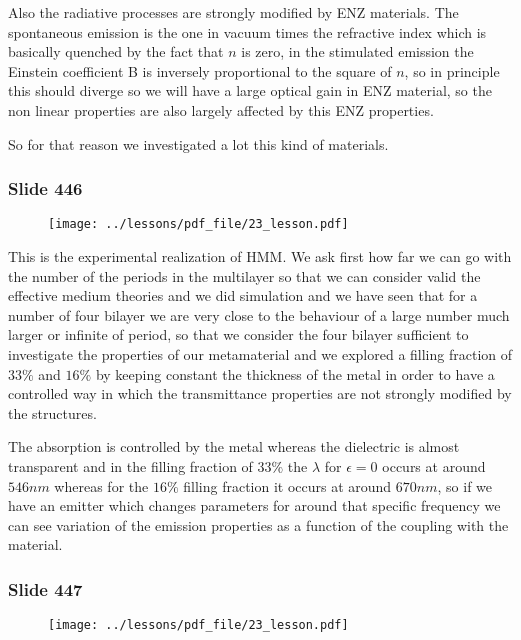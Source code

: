 \documentclass[../main/main.tex]{subfiles}
\begin{document}
Also the radiative processes are strongly modified by ENZ materials. The spontaneous emission is the one in vacuum times the refractive index which is basically quenched by the fact that $n$ is zero, in the stimulated emission the Einstein coefficient B is inversely proportional to the square of $n$, so in principle this should diverge so we will have a large optical gain in ENZ material, so the non linear properties are also largely affected by this ENZ properties.

So for that reason we investigated a lot this kind of materials.

\newpage

\subsubsection{Slide 446}

\begin{figure}[h!]
\centering
\texttt{[image: ../lessons/pdf\_file/23\_lesson.pdf]}
\end{figure}

This is the experimental realization of HMM. We ask first how far we can go with the number of the periods in the multilayer so that we can consider valid the effective medium theories and we did simulation and we have seen that for a number of four bilayer we are very close to the behaviour of a large number much larger or infinite of period, so that we consider the four bilayer sufficient to investigate the properties of our metamaterial and we explored a filling fraction of $33\%$ and $16\%$ by keeping constant the thickness of the metal in order to have a controlled way in which the transmittance properties are not strongly modified by the structures.

The absorption is controlled by the metal whereas the dielectric is almost transparent and in the filling fraction of $33\%$ the $\lambda$ for $\epsilon = 0$ occurs at around $546 nm$ whereas for the $16\%$ filling fraction it occurs at around $670 nm$, so if we have an emitter which changes parameters for around that specific frequency we can see variation of the emission properties as a function of the coupling with the material.

\newpage

\subsubsection{Slide 447}

\begin{figure}[h!]
\centering
\texttt{[image: ../lessons/pdf\_file/23\_lesson.pdf]}
\end{figure}
\end{document}
